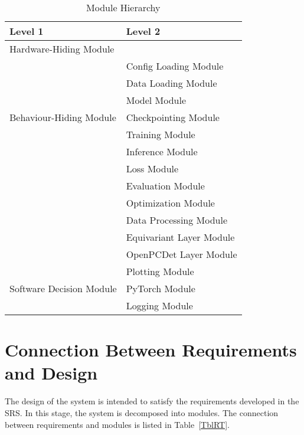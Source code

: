 \documentclass[12pt, titlepage]{article}
\begin{document}
\begin{table}[h!]
\centering
\begin{tabular}{p{} p{}}
\toprule
\textbf{Level 1} & \textbf{Level 2}\\
\midrule

{Hardware-Hiding Module} & ~ \\
\midrule

\multirow{7}{0.3\textwidth}{Behaviour-Hiding Module} 
& Config Loading Module\\
& Data Loading Module\\
& Model Module\\
& Checkpointing Module\\
& Training Module\\
& Inference Module\\
& Loss Module\\ 
& Evaluation Module\\
& Optimization Module\\
& Data Processing Module\\
& Equivariant Layer Module\\
& OpenPCDet Layer Module\\
\midrule

\multirow{3}{0.3\textwidth}{Software Decision Module}
& Plotting Module\\
& PyTorch Module\\
& Logging Module\\
\bottomrule

\end{tabular}
\caption{Module Hierarchy}
\label{TblMH}
\end{table}

\section{Connection Between Requirements and Design} \label{SecConnection}

The design of the system is intended to satisfy the requirements developed in
the SRS. In this stage, the system is decomposed into modules. The connection
between requirements and modules is listed in Table~\ref{TblRT}.

\end{document}
